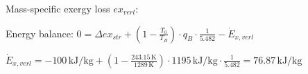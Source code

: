 Mass-specific exergy loss \( ex_{verl} \):  

Energy balance:  
\( 0 = \Delta ex_{str} + \left( 1 - \frac{T_0}{T_B} \right) \cdot q_B \cdot \frac{1}{5.482} - \dot{E}_{x,verl} \)  

\( \dot{E}_{x,verl} = -100 \, \text{kJ/kg} + \left( 1 - \frac{243.15 \, \text{K}}{1289 \, \text{K}} \right) \cdot 1195 \, \text{kJ/kg} \cdot \frac{1}{5.482} = 76.87 \, \text{kJ/kg} \)